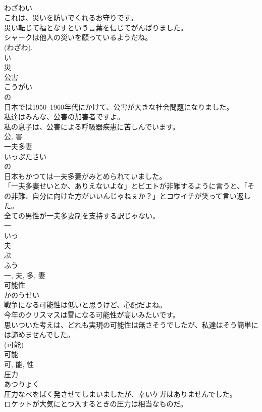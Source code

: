 \documentclass[8pt]{extreport}
\begin{document}
\begin{CJK}{UTF8}{min}
\\	わざわい	
\\	これは、災いを防いでくれるお守りです。	
\\	災い転じて福となすという言葉を信じてがんばりました。	
\\	シャークは他人の災いを願っているようだね。	
\\	(わざわ). 
\\	い 
\\	災	
\\	公害	
\\	こうがい	
\\	の 
\\	日本では1950~1960年代にかけて、公害が大きな社会問題になりました。	
\\	私達はみんな、公害の加害者ですよ。	
\\	私の息子は、公害による呼吸器疾患に苦しんでいます。	
\\	公, 害	
\\	一夫多妻	
\\	いっぷたさい	
\\	の 
\\	日本もかつては一夫多妻がみとめられていました。	
\\	「一夫多妻せいとか、ありえないよな」とビエトが非難するように言うと、「その非難、自分に向けた方がいいんじゃねぇか？」とコウイチが笑って言い返した。	
\\	全ての男性が一夫多妻制を支持する訳じゃない。	
\\	一 
\\	いっ 
\\	夫 
\\	ぷ 
\\	ふう 
\\	一, 夫, 多, 妻	
\\	可能性	
\\	かのうせい	
\\	戦争になる可能性は低いと思うけど、心配だよね。	
\\	今年のクリスマスは雪になる可能性が高いみたいです。	
\\	思いついた考えは、どれも実現の可能性は無さそうでしたが、私達はそう簡単には諦めませんでした。	
\\	(可能) 
\\	可能 
\\	可, 能, 性	
\\	圧力	
\\	あつりょく	
\\	圧力なべをばく発させてしまいましたが、幸いケガはありませんでした。	
\\	ロケットが大気にとつ入するときの圧力は相当なものだ。	

\end{CJK}
\end{document}
